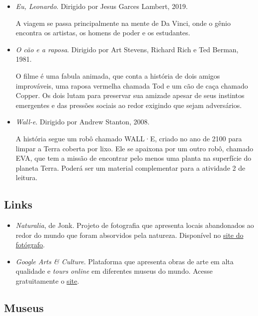 \documentclass[11pt]{extarticle}
\begin{document}
\begin{itemize}

\item \textit{Eu, Leonardo}. Dirigido por Jesus Garces Lambert, 2019.

A viagem se passa principalmente na mente de Da Vinci, onde o gênio encontra os artistas, os homens de poder e os estudantes.

\item \textit{O cão e a raposa}. Dirigido por Art Stevens, Richard Rich e Ted Berman, 1981.

O filme é uma fabula animada, que conta a história de dois amigos improváveis, uma raposa vermelha chamada Tod e um cão de caça chamado Copper. Os dois lutam para preservar sua amizade apesar de seus instintos emergentes e das pressões sociais ao redor exigindo que sejam adversários. 

\item \textit{Wall-e}. Dirigido por Andrew Stanton, 2008.

A história segue um robô chamado WALL·E, criado no ano de 2100 para limpar a Terra coberta por lixo. Ele se apaixona por um outro robô, chamado EVA, que tem a missão de encontrar pelo menos uma planta na superfície do planeta Terra. Poderá ser um material complementar para a atividade 2 de leitura.

\end{itemize}

\subsection{Links}

\begin{itemize}

\item \textit{Naturalia}, de Jonk. Projeto de fotografia que apresenta locais abandonados ao redor do mundo que foram absorvidos pela natureza. Disponível no \href{https://www.jonk-photography.com/en/naturalia/}{site do fotógrafo}. 

\item \textit{Google Arts \& Culture}. Plataforma que apresenta obras de arte em alta qualidade e \textit{tours online} em diferentes museus do mundo. Acesse gratuitamente o \href{https://artsandculture.google.com/}{site}. 

\end{itemize}

\subsection{Museus}
\end{document}
